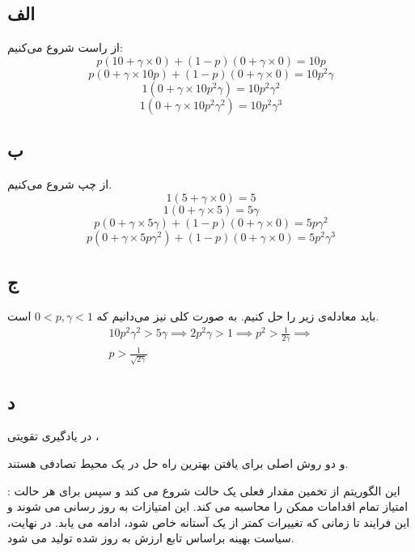 \subsection*{الف}
از راست شروع می‌کنیم:
$$p (10 + \gamma \times 0) + (1 - p) (0 + \gamma \times 0) = 10p$$
$$p (0 + \gamma \times 10p) + (1 - p) (0 + \gamma \times 0) = 10p^2 \gamma$$
$$1 (0 + \gamma \times 10p^2 \gamma) = 10p^2 \gamma^2$$
$$1 (0 + \gamma \times 10p^2 \gamma^2) = 10p^2 \gamma^3$$

\subsection*{ب}
از چپ شروع می‌کنیم.
$$1 (5 + \gamma \times 0) = 5$$
$$1 (0 + \gamma \times 5) = 5\gamma$$
$$p (0 + \gamma \times 5\gamma) + (1 - p) (0 + \gamma \times 0) = 5 p \gamma^2$$
$$p (0 + \gamma \times 5p\gamma^2) + (1 - p) (0 + \gamma \times 0) = 5 p^2 \gamma^3$$

\subsection*{ج}
باید معادله‌ی زیر را حل کنیم. به صورت کلی نیز می‌دانیم که
	$0 < p, \gamma < 1$
	است.
	\begin{gather*}
		10p^2 \gamma^2 > 5\gamma \implies 2p^2 \gamma > 1 \implies p^2 > \frac{1}{2\gamma} \implies\\
		p > \frac{1}{\sqrt{2\gamma}}
	\end{gather*}

\subsection*{د}


در یادگیری تقویتی
،
 
و
دو روش اصلی برای یافتن بهترین راه حل
در یک محیط تصادفی هستند.

:
این الگوریتم از تخمین مقدار فعلی یک حالت شروع می کند و سپس برای هر حالت امتیاز تمام اقدامات ممکن را محاسبه می کند. این امتیازات به روز رسانی می شوند و این فرایند تا زمانی که تغییرات کمتر از یک آستانه خاص شود، ادامه می یابد. در نهایت، سیاست بهینه براساس تابع ارزش به روز شده تولید می شود.


